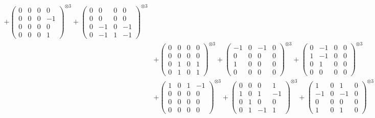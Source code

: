 \documentclass{article}
\begin{document}
{\begin{align}
            + \begin{pmatrix} 0 & 0 & 0 & 0 \\ 0 & 0 & 0 & -1 \\ 0 & 0 & 0 & 0 \\ 0 & 0 & 0 & 1 \end{pmatrix}^{\otimes 3} 
            + \begin{pmatrix} 0 & 0 & 0 & 0 \\ 0 & 0 & 0 & 0 \\ 0 & -1 & 0 & -1 \\ 0 & -1 & 1 & -1 \end{pmatrix}^{\otimes 3} \\
        &+ \label{Rs16-Rc11-Solution-17-c10} \begin{pmatrix} 0 & 0 & 0 & 0 \\ 0 & 0 & 0 & 0 \\ 0 & 1 & 0 & 1 \\ 0 & 1 & 0 & 1 \end{pmatrix}^{\otimes 3} 
            + \begin{pmatrix} -1 & 0 & -1 & 0 \\ 0 & 0 & 0 & 0 \\ 1 & 0 & 0 & 0 \\ 0 & 0 & 0 & 0 \end{pmatrix}^{\otimes 3} 
            + \begin{pmatrix} 0 & -1 & 0 & 0 \\ 1 & -1 & 0 & 0 \\ 0 & 1 & 0 & 0 \\ 0 & 0 & 0 & 0 \end{pmatrix}^{\otimes 3} \\
        &+ \label{Rs16-Rc11-Solution-17-c13} \begin{pmatrix} 1 & 0 & 1 & -1 \\ 0 & 0 & 0 & 0 \\ 0 & 0 & 0 & 0 \\ 0 & 0 & 0 & 0 \end{pmatrix}^{\otimes 3} 
            + \begin{pmatrix} 0 & 0 & 0 & 1 \\ 1 & 0 & 1 & -1 \\ 0 & 1 & 0 & 0 \\ 0 & 1 & -1 & 1 \end{pmatrix}^{\otimes 3} 
            + \begin{pmatrix} 1 & 0 & 1 & 0 \\ -1 & 0 & -1 & 0 \\ 0 & 0 & 0 & 0 \\ 1 & 0 & 1 & 0 \end{pmatrix}^{\otimes 3} \\

\end{align}}
\end{document}
